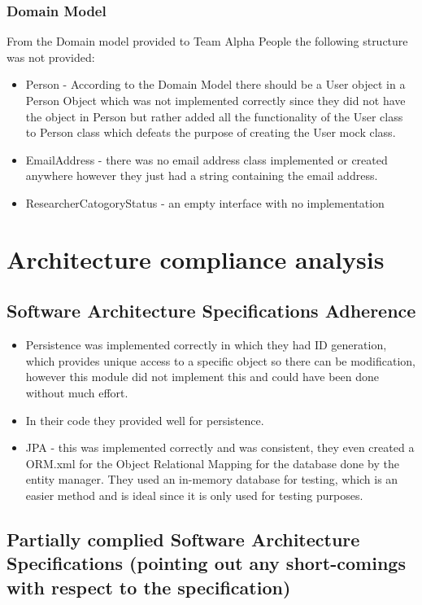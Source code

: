 \documentclass{article}
\begin{document}
	\subsubsection{Domain Model}
	From the Domain model provided to Team Alpha People the following structure was not provided:
	\begin{itemize}
		\item Person - According to the Domain Model there should be a User object in a Person Object which was not implemented correctly since they did not have the object in Person but rather added all the functionality of the User class to Person class which defeats the purpose of creating the User mock class.
		\item EmailAddress - there was no email address class implemented or created anywhere however they just had a string containing the email address.
		\item ResearcherCatogoryStatus - an empty interface with no implementation
	 \end{itemize}

\section{Architecture compliance analysis}
	\subsection{Software Architecture Specifications Adherence}
	\begin{itemize}

	\item Persistence was implemented correctly in which they had ID generation, which provides unique access to a specific object so there can be modification, however this module did not implement this and could have been done without much effort. 

			\item In their code they provided well for persistence.
		\item JPA - this was implemented correctly and was consistent, they even created a ORM.xml for the Object Relational Mapping for the database done by the entity manager. They used an in-memory database for testing, which is an easier method and is ideal since it is only used for testing purposes.
	\end{itemize}

	\subsection{Partially complied Software Architecture Specifications (pointing out any short-comings with respect to the specification)}
\end{document}
